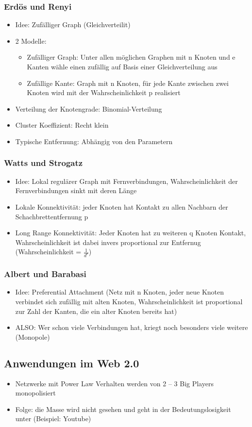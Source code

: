 \documentclass{article} %
\begin{document}
	\subsubsection{Erdös und Renyi}
	\begin{itemize}
		\item Idee: Zufälliger Graph (Gleichverteilit)
		\item 2 Modelle:
		\begin{itemize}
			\item Zufälliger Graph: Unter allen möglichen Graphen mit n Knoten und e Kanten wähle einen zufällig auf Basis einer Gleichverteilung aus
			\item Zufällige Kante: Graph mit n Knoten, für jede Kante zwischen zwei Knoten wird mit der Wahrscheinlichkeit p realisiert
		\end{itemize}
		\item Verteilung der Knotengrade: Binomial-Verteilung
		\item Cluster Koeffizient: Recht klein
		\item Typische Entfernung: Abhängig von den Parametern
	\end{itemize}
	\subsubsection{Watts und Strogatz}
	\begin{itemize}
		\item Idee: Lokal regulärer Graph mit Fernverbindungen, Wahrscheinlichkeit der Fernverbindungen sinkt mit deren Länge 
		\item Lokale Konnektivität: jeder Knoten hat Kontakt zu allen Nachbarn der Schachbrettentfernung p
		\item Long Range Konnektivität: Jeder Knoten hat zu weiteren q Knoten Kontakt, Wahrscheinlichkeit ist dabei invers proportional zur Entfernug (Wahrscheinlichkeit = $\frac{1}{d^{r}}$)
	\end{itemize}
	\subsubsection{Albert und Barabasi}
	\begin{itemize}
		\item Idee: Preferential Attachment (Netz mit n Knoten, jeder neue Knoten verbindet sich zufällig mit alten Knoten, Wahrscheinlichkeit ist proportional zur Zahl der Kanten, die ein alter Knoten bereits hat)
		\item ALSO: Wer schon viele Verbindungen hat, kriegt noch besonders viele weitere (Monopole)
	\end{itemize}
	\subsection{Anwendungen im Web 2.0}
	\begin{itemize}
		\item Netzwerke mit Power Law Verhalten werden von 2 – 3 Big Players monopolisiert
		\item Folge: die Masse wird nicht gesehen und geht in der Bedeutungslosigkeit unter (Beispiel: Youtube)

	\end{itemize}
\end{document}
